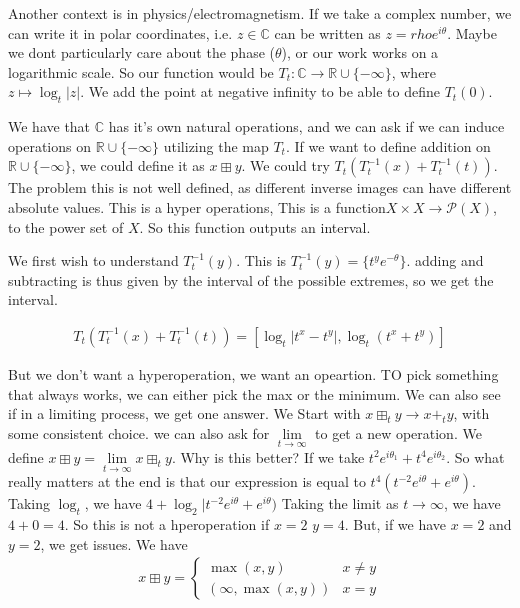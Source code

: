 \documentclass[11pt]{article}
\theoremstyle{definition}
\theoremstyle{plain}%
\theoremstyle{definition}
\def\RR{{\mathbb R}}
\def\CC{{\mathbb C}}
\begin{document}
Another context is in physics/electromagnetism. If we take a complex number, we can write it in polar coordinates, i.e. $z \in \CC$ can be written as $z = rho e^{i \theta}$. Maybe we dont particularly care about the phase ($\theta$), or our work works on a logarithmic scale. So our function would be $T_t: \CC \rightarrow \RR\cup \{-\infty\}$, where $z \mapsto \log_t|z|$. We add the point at negative infinity to be able to define $T_t(0)$.


We have that $\CC$ has it's own natural operations, and we can ask if we can induce operations on $\RR\cup \{-\infty\}$ utilizing the map $T_t$. If we want to define addition on $\RR\cup\{-\infty\}$, we could define it as $x \boxplus y$. We could try $ T_t( T_t^{-1}(x) + T_t^{-1}(t))$. The problem this is not well defined, as different inverse images can have different absolute values. This is a hyper operations, This is a function$ X \times X \rightarrow \mathcal{P}(X)$, to the power set of $X$. So this function outputs an interval.

We first wish to understand $T_t^{-1}(y)$. This is $T_t^{-1}(y) = \{t^ye^{-\theta}\}$. adding and subtracting is thus given by the interval of the possible extremes, so we get the interval.

\begin{align*}
    T_t( T_t^{-1}(x) + T_t^{-1}(t)) = [ \log_{t} |t^x-t^y|, \log_t(t^x+t^y)]
\end{align*}

But we don't want a hyperoperation, we want an opeartion. TO pick something that always works, we can either pick the max or the minimum. We can also see if in a limiting process, we get one answer.  We Start with $x \boxplus_t y \rightarrow x+_t y$, with some consistent choice. we can also ask for $\lim\limits_{t \rightarrow \infty}$ to get a new operation. We define $x \boxplus y = \lim\limits_{t \rightarrow \infty} x \boxplus_t y$. Why is this better? If we take $t^2e^{i\theta_1} + t^4 e^{i\theta_2}$. So what really matters at the end is that our expression is equal to $t^4(t^{-2}e^{i\theta} +e^{i\theta})$. Taking $\log_t$, we have $4+ \log_2|t^{-2}e^{i\theta} + e^{i\theta})$ Taking the limit as $t \rightarrow \infty$, we have $4+0=4$. So this is not a hperoperation if $x=2$ $y=4$. But, if we have $x=2$ and $y=2$, we get issues. We have
\begin{align*}
    x\boxplus y = \begin{cases}
        \max(x,y) & x \neq y
        \\
        (\infty, \max(x,y) ) & x =y
    \end{cases}
\end{align*}
\end{document}
